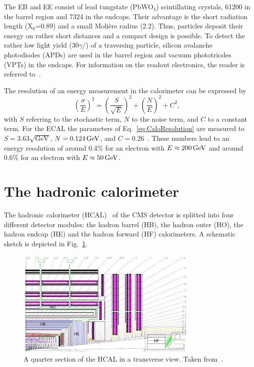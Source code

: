The EB and EE consist of lead tungstate (PbWO$_4$) scintillating crystals, 61200 in the barrel region and 7324 in the endcaps. 
Their advantage is the short radiation length (X$_0$=0.89\cm) and a small Moli\`ere radius (2.2\cm).
Thus, particles deposit their energy on rather short distances and a compact design is possible.
To detect the rather low light yield (30$\gamma$/\mev) of a traversing particle, silicon avalanche photodiodes (APDs) are used in the barrel region and vacuum  phototriodes (VPTs) in the endcaps.
For information on the readout electronics, the reader is referred to~\cite{bib:CMS:TDR_2006}.

The resolution of an energy measurement in the calorimeter can be expressed by 
\begin{equation}
\label{eq:CaloResolution}
\left( \frac{\sigma}{E} \right)^2 = \left( \frac{S}{\sqrt{E}} \right)^2 + \left( \frac{N}{E} \right)^2 +C^2,
\end{equation}
with $S$ referring to the stochastic term, $N$ to the noise term, and $C$ to a constant term.
For the ECAL the parameters of Eq.~\eqref{eq:CaloResolution} are measured to $S=3.63\sqrt{\text{GeV}}$, $N=0.124\,\text{Ge}\kern-0.06667em\text{V}$, and $C=0.26$~\cite{bib:CMS:TDR_2006}. 
These numbers lead to an energy resolution of around 0.4\% for an electron with $E \approx 200\,\text{Ge}\kern-0.06667em\text{V}$ and around 0.6\% for an electron with $E \approx 50\,\text{Ge}\kern-0.06667em\text{V}$.

\section{The hadronic calorimeter}
The hadronic calorimeter (HCAL)~\cite{bib:CMS:TDR_2006,bib:CMS:TDR_HCAL} of the CMS detector is splitted into four different detector modules: the hadron barrel (HB), the hadron outer (HO), the hadron endcap (HE) and the hadron forward (HF) calorimeters.
A schematic sketch is depicted in Fig.~\ref{fig:HCAL}.
\begin{figure}[!ht]
  \centering
      \includegraphics[width=0.79\textwidth]{figures/experiment/CMS/fig_HCALdiagram_smaller_size.png}
  \caption{A quarter section of the HCAL in a transverse view. Taken from~\cite{bib:CMS:HCAL_Performance_2009}.}  
  \label{fig:HCAL}
\end{figure}

